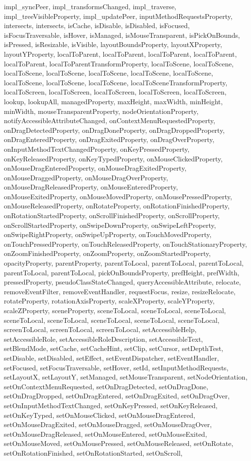 {{{{{{{{{{{{{{{{{{{{{{{{{{{{{{{{{{{{{{{{{{{{{{{{{{{{{{{{{{{{{{{{{{{{{{impl\_syncPeer, impl\_transformsChanged, impl\_traverse, impl\_treeVisibleProperty, impl\_updatePeer, inputMethodRequestsProperty, intersects, intersects, isCache, isDisable, isDisabled, isFocused, isFocusTraversable, isHover, isManaged, isMouseTransparent, isPickOnBounds, isPressed, isResizable, isVisible, layoutBoundsProperty, layoutXProperty, layoutYProperty, localToParent, localToParent, localToParent, localToParent, localToParent, localToParentTransformProperty, localToScene, localToScene, localToScene, localToScene, localToScene, localToScene, localToScene, localToScene, localToScene, localToScene, localToSceneTransformProperty, localToScreen, localToScreen, localToScreen, localToScreen, localToScreen, lookup, lookupAll, managedProperty, maxHeight, maxWidth, minHeight, minWidth, mouseTransparentProperty, nodeOrientationProperty, notifyAccessibleAttributeChanged, onContextMenuRequestedProperty, onDragDetectedProperty, onDragDoneProperty, onDragDroppedProperty, onDragEnteredProperty, onDragExitedProperty, onDragOverProperty, onInputMethodTextChangedProperty, onKeyPressedProperty, onKeyReleasedProperty, onKeyTypedProperty, onMouseClickedProperty, onMouseDragEnteredProperty, onMouseDragExitedProperty, onMouseDraggedProperty, onMouseDragOverProperty, onMouseDragReleasedProperty, onMouseEnteredProperty, onMouseExitedProperty, onMouseMovedProperty, onMousePressedProperty, onMouseReleasedProperty, onRotateProperty, onRotationFinishedProperty, onRotationStartedProperty, onScrollFinishedProperty, onScrollProperty, onScrollStartedProperty, onSwipeDownProperty, onSwipeLeftProperty, onSwipeRightProperty, onSwipeUpProperty, onTouchMovedProperty, onTouchPressedProperty, onTouchReleasedProperty, onTouchStationaryProperty, onZoomFinishedProperty, onZoomProperty, onZoomStartedProperty, opacityProperty, parentProperty, parentToLocal, parentToLocal, parentToLocal, parentToLocal, parentToLocal, pickOnBoundsProperty, prefHeight, prefWidth, pressedProperty, pseudoClassStateChanged, queryAccessibleAttribute, relocate, removeEventFilter, removeEventHandler, requestFocus, resize, resizeRelocate, rotateProperty, rotationAxisProperty, scaleXProperty, scaleYProperty, scaleZProperty, sceneProperty, sceneToLocal, sceneToLocal, sceneToLocal, sceneToLocal, sceneToLocal, sceneToLocal, sceneToLocal, sceneToLocal, screenToLocal, screenToLocal, screenToLocal, setAccessibleHelp, setAccessibleRole, setAccessibleRoleDescription, setAccessibleText, setBlendMode, setCache, setCacheHint, setClip, setCursor, setDepthTest, setDisable, setDisabled, setEffect, setEventDispatcher, setEventHandler, setFocused, setFocusTraversable, setHover, setId, setInputMethodRequests, setLayoutX, setLayoutY, setManaged, setMouseTransparent, setNodeOrientation, setOnContextMenuRequested, setOnDragDetected, setOnDragDone, setOnDragDropped, setOnDragEntered, setOnDragExited, setOnDragOver, setOnInputMethodTextChanged, setOnKeyPressed, setOnKeyReleased, setOnKeyTyped, setOnMouseClicked, setOnMouseDragEntered, setOnMouseDragExited, setOnMouseDragged, setOnMouseDragOver, setOnMouseDragReleased, setOnMouseEntered, setOnMouseExited, setOnMouseMoved, setOnMousePressed, setOnMouseReleased, setOnRotate, setOnRotationFinished, setOnRotationStarted, setOnScroll, }}}}}}}}}}}}}}}}}}}}}}}}}}}}}}}}}}}}}}}}}}}}}}}}}}}}}}}}}}}}}}}}}}}}}}

